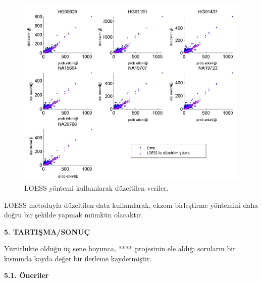 \documentclass[11pt]{article}
\begin{document}
\begin{figure}[htb]
\begin{center}
  \includegraphics[scale=0.65]{captureeff-loess.png}
\end{center}
\caption{LOESS yöntemi kullanılarak düzeltilen veriler.}
\label{fig:captureeffloess}
\end{figure}

LOESS metoduyla düzeltilen data kullanılarak, ekzom birleştirme yöntemini daha doğru bir şekilde yapmak mümkün olacaktır.

\clearpage

\begin{center}
{\bf \Large 5. TARTIŞMA/SONUÇ}
\end{center}

\noindent
Yürürlükte olduğu üç sene boyunca, **** projesinin ele aldığı soruların bir kısmında kayda değer bir ilerleme kaydetmiştir. 

\noindent
{\bf \Large 5.1. Öneriler}

{\small 



}




\label{endsectionb1}
\end{document}
